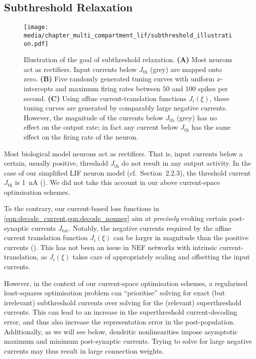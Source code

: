 \subsection{Subthreshold Relaxation}
\label{sec:nef_subthreshold}

\begin{figure}
	\texttt{[image: media/chapter\_multi\_compartment\_lif/subthreshold\_illustration.pdf]}%
	{\label{fig:subthreshold_illustration_a}}%
	{\label{fig:subthreshold_illustration_b}}%
	{\label{fig:subthreshold_illustration_c}}%
	\caption[Illustration of the goal of subthreshold relaxation]{Illustration of the goal of subthreshold relaxation.
	\textbf{(A)} Most neurons act as rectifiers. Input currents below $J_\mathrm{th}$ (grey) are mapped onto zero.
	\textbf{(B)} Five randomly generated tuning curves with uniform $x$-intercepts and maximum firing rates between $50$ and $100$ spikes per second.
	\textbf{(C)} Using affine current-translation functions $J_i(\xi)$, these tuning curves are generated by comparably large negative currents. However, the magnitude of the currents below $J_\mathrm{th}$ (grey) has no effect on the output rate; in fact any current below $J_\mathrm{th}$ has the same effect on the firing rate of the neuron.
	}
\end{figure}

Most biological model neurons act as rectifiers.
That is, input currents below a certain, usually positive, threshold $J_\mathrm{th}$ do not result in any output activity.
In the case of our simplified LIF neuron model (cf.~Section~2.2.3), the threshold current $J_\mathrm{th}$ is \SI{1}{\nano\ampere} ().
We did not take this account in our above current-space optimisation schemes.

To the contrary, our current-based loss functions in \cref{eqn:decode_current,eqn:decode_nonneg} aim at \emph{precisely} evoking certain post-synaptic currents $J_\mathrm{tar}$.
Notably, the negative currents required by the affine current translation function $J_i(\xi)$ can be larger in magnitude than the positive currents ().
This has not been an issue in NEF networks with intrinsic current-translation, as $J_i(\xi)$ takes care of appropriately scaling and offsetting the input currents.

However, in the context of our current-space optimisation schemes, a regularised least-squares optimisation problem can \enquote{prioritise} solving for exact (but irrelevant) subthreshold currents over solving for the (relevant) superthreshold currents.
This can lead to an increase in the superthreshold current-decoding error, and thus also increase the representation error in the post-population.
Additionally, as we will see below, dendritic nonlinearities impose asymptotic maximum and minimum post-synaptic currents.
Trying to solve for large negative currents may thus result in large connection weights.

